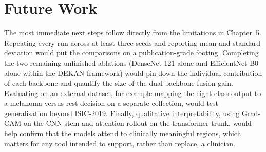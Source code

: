 \section{Future Work}

The most immediate next steps follow directly from the limitations in
Chapter~5. Repeating every run across at least three seeds and reporting mean and
standard deviation would put the comparisons on a publication-grade footing.
Completing the two remaining unfinished ablations (DenseNet-121 alone and
EfficientNet-B0 alone within the DEKAN framework) would pin down the
individual contribution of each backbone and quantify the size of the
dual-backbone fusion gain. Evaluating on an external dataset, for example mapping
the eight-class output to a melanoma-versus-rest decision on a separate
collection, would test generalisation beyond ISIC-2019. Finally, qualitative
interpretability, using Grad-CAM on the CNN stem and attention rollout on the
transformer trunk, would help confirm that the models attend to clinically
meaningful regions, which matters for any tool intended to support, rather than
replace, a clinician.
